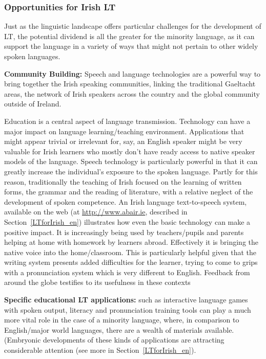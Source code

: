 \begin{multicols}{2}
\subsubsection{Opportunities for Irish LT}

Just as the linguistic landscape offers particular challenges for the development of LT, the potential dividend is all the greater for the minority language, as it can support the language in a variety of ways that might not pertain to other widely spoken languages. 

\textbf{Community Building:} Speech and language technologies are a powerful way to bring together the Irish speaking communities, linking the traditional Gaeltacht areas, the network of Irish speakers across the country and the global community outside of Ireland.

Education is a central aspect of language transmission. Technology can have a major impact on language learning/teaching environment. Applications that might appear trivial or irrelevant for, say, an English speaker might be very valuable for Irish learners who mostly don't have ready access to native speaker models of the language. Speech technology is particularly powerful in that it can greatly increase the individual's exposure to the spoken language. Partly for this reason, traditionally the teaching of Irish focused on the learning of written forms, the grammar and the reading of literature, with a relative neglect of the development of spoken competence. An Irish language text-to-speech system, available on the web (at \url{http://www.abair.ie}, described in Section~\ref{LTforIrish_en}) illustrates how even the basic technology can make a positive impact. It is increasingly being used by teachers/pupils and parents helping at home with homework by learners abroad. Effectively it is bringing the native voice into the home/classroom. This is particularly helpful given that the writing system presents added difficulties for the learner, trying to come to grips with a pronunciation system which is very different to English. Feedback from around the globe testifies to its usefulness in these contexts

\textbf{Specific educational LT applications:} such as interactive language games with spoken output, literacy and pronunciation training tools can play a much more vital role in the case of a minority language, where, in comparison to English/major world languages, there are a wealth of materials available. (Embryonic developments of these kinds of applications are attracting considerable attention (see more in Section~\ref{LTforIrish_en}).


\end{multicols}
